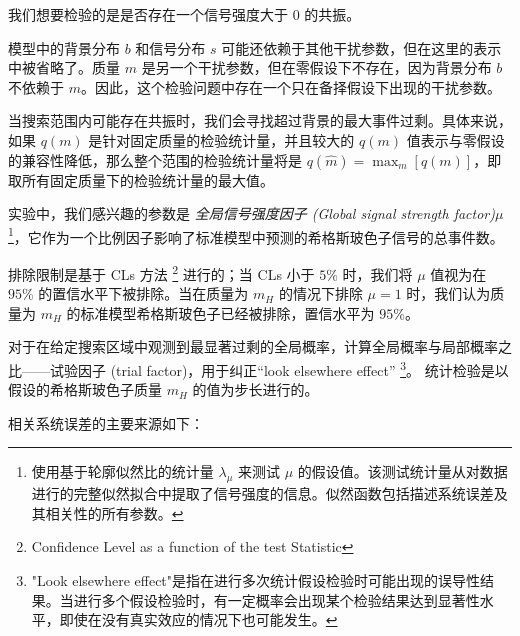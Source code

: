 \documentclass[oneside,a4paper,openany,11pt]{ctexbook}
\begin{document}
我们想要检验的是是否存在一个信号强度大于 $0$ 的共振。

模型中的背景分布 $b$ 和信号分布 $s$ 可能还依赖于其他干扰参数，但在这里的表示中被省略了。质量 $m$ 是另一个干扰参数，但在零假设下不存在，因为背景分布 $b$ 不依赖于 $m$。因此，这个检验问题中存在一个只在备择假设下出现的干扰参数。

当搜索范围内可能存在共振时，我们会寻找超过背景的最大事件过剩。具体来说，如果 $q(m)$ 是针对固定质量的检验统计量，并且较大的 $q(m)$ 值表示与零假设的兼容性降低，那么整个范围的检验统计量将是 $q(\hat{m})=\max_m ⁡[q(m)]$，即取所有固定质量下的检验统计量的最大值。

实验中，我们感兴趣的参数是 \emph{全局信号强度因子 (Global signal strength factor)}$\mu$ \footnote{使用基于轮廓似然比的统计量 $\lambda_\mu$ 来测试 $\mu$ 的假设值。该测试统计量从对数据进行的完整似然拟合中提取了信号强度的信息。似然函数包括描述系统误差及其相关性的所有参数。}，它作为一个比例因子影响了标准模型中预测的希格斯玻色子信号的总事件数。

排除限制是基于 CLs 方法 \footnote{Confidence Level as a function of the test Statistic} 进行的；当 CLs 小于 $5\%$ 时，我们将 $\mu$ 值视为在 $95\%$ 的置信水平下被排除。当在质量为 $m_H$ 的情况下排除 $\mu=1$ 时，我们认为质量为 $m_H$ 的标准模型希格斯玻色子已经被排除，置信水平为 $95\%$。

对于在给定搜索区域中观测到最显著过剩的全局概率，计算全局概率与局部概率之比——试验因子 (trial factor)，用于纠正“look elsewhere effect” \footnote{"Look elsewhere effect"是指在进行多次统计假设检验时可能出现的误导性结果。当进行多个假设检验时，有一定概率会出现某个检验结果达到显著性水平，即使在没有真实效应的情况下也可能发生。}。 统计检验是以假设的希格斯玻色子质量 $m_H$ 的值为步长进行的。

相关系统误差的主要来源如下：
\end{document}

